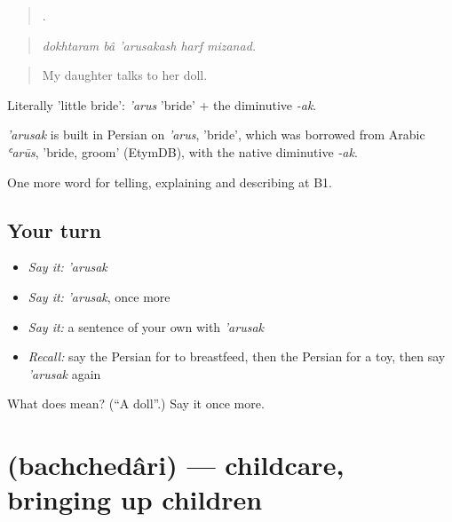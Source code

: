 \begin{quote}
    .
\end{quote}

\begin{quote}
\emph{dokhtaram bâ 'arusakash harf mizanad.}
\end{quote}

\begin{quote}
My daughter talks to her doll.
\end{quote}

Literally 'little bride': \emph{'arus} 'bride' + the diminutive \emph{-ak}.

\begin{cousinweb}
\emph{'arusak} is built in Persian on \emph{'arus}, 'bride', which was borrowed from Arabic \emph{ʿarūs}, 'bride, groom' (EtymDB), with the native diminutive \emph{-ak}.
\end{cousinweb}

\begin{grammarlens}[title={What you've built}]
One more word for telling, explaining and describing at B1.
\end{grammarlens}

\subsection*{Your turn}
\begin{itemize}
\raggedright
  \item \emph{Say it:} \emph{'arusak}
  \item \emph{Say it:} \emph{'arusak}, once more
  \item \emph{Say it:} a sentence of your own with \emph{'arusak}
  \item \emph{Recall:} say the Persian for to breastfeed, then the Persian for a toy, then say \emph{'arusak} again
\end{itemize}

\begin{tcolorbox}[breakable,colback=teal!4,colframe=teal!35!black,title={Before you move on}]
What does  mean? (\textquotedblleft{}A doll\textquotedblright{}.) Say it once more.
\end{tcolorbox}
\section[\texorpdfstring{\fa{بچه} \fa{داری} (bachchedâri)}{بچه داری (bachchedâri)}]{  (bachchedâri) — childcare, bringing up children}

